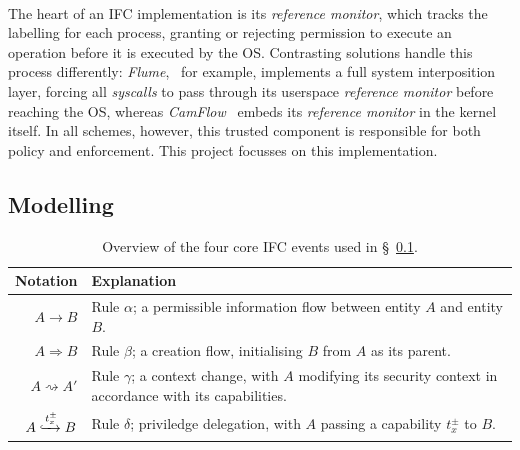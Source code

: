 \paragraph{} The heart of an IFC implementation is its \textit{reference monitor}, which tracks the labelling for each process, granting or rejecting permission to execute an operation before it is executed by the OS. Contrasting solutions handle this process differently: \textit{Flume},~\cite{flume} for example, implements a full system interposition layer, forcing all \textit{syscalls} to pass through its userspace \textit{reference monitor} before reaching the OS, whereas \textit{CamFlow}~\cite{camflow} embeds its \textit{reference monitor} in the kernel itself. In all schemes, however, this trusted component is responsible for both policy and enforcement. This project focusses on this implementation.


\subsection{Modelling}
\label{sec:ifc-modelling}

\begin{table}
    \centering
    \newcommand\tableTop{\rule{0pt}{3ex}}
    \newcommand\tableMid{\rule{0pt}{3ex}}
    \newcommand\tableBottom{\rule[-2ex]{0pt}{0pt}}
    \begin{tabular}{r p{10cm}} 
        \hline
        Notation & Explanation \\ [0.1ex] 
        \hline
            \tableTop{$A \rightarrow B$} & \tableTop{Rule $\alpha$; a permissible information flow between entity $A$ and entity $B$.} \\
            
            $A \Rightarrow B$ & \tableMid{Rule $\beta$; a creation flow, initialising $B$ from $A$ as its parent.} \\

            $A \rightsquigarrow A'$ & \tableMid{Rule $\gamma$; a context change, with $A$ modifying its security context in accordance with its capabilities.} \\
            
            $A \xhookrightarrow[]{t^{\pm}_{x}} B$ & \tableMid{Rule $\delta$; priviledge delegation, with $A$ passing a capability $t_{x}^{\pm}$ to $B$.} \tableBottom \\
    \end{tabular}
    \caption{Overview of the four core IFC events used in §~\ref{sec:ifc-modelling}.}
    \label{table:ifc-notation}
\end{table}


